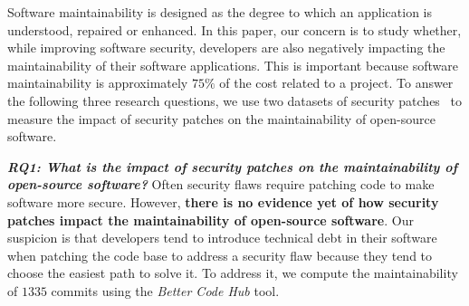 \documentclass[10pt,conference]{IEEEtran}
\newcommand\Sof[1]{\nb{Sofia}{red}{#1}}
\begin{document}


Software maintainability is designed as the degree to which an application is understood, 
repaired or enhanced. In this paper, our concern is to study whether, while improving software
security, developers are also negatively impacting the maintainability of their
software applications. This is important because software maintainability is 
approximately $75\%$ of the cost related to a project. To answer the following three 
research questions, we use two datasets of security patches~\cite{Reis:2017:IJSSE, 10.1109/MSR.2019.00064} 
to measure the impact of
security patches on the maintainability of open-source software. 
%

\textit{\textbf{RQ1: What is the impact of security patches on the
maintainability of open-source software?}} Often security flaws require patching 
code to make software more secure.
However, \textbf{there is no evidence yet of how security patches impact the
maintainability of open-source software}. Our suspicion is that developers tend
to introduce technical debt in their software when patching the code base to
address a security flaw because they tend to choose the easiest path to solve
it. To address it, we compute the maintainability of $1335$ commits using the
\emph{Better Code Hub} tool. 
%
\end{document}
